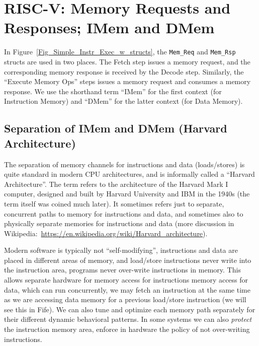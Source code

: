 
\section{RISC-V: Memory Requests and Responses; IMem and DMem}


In Figure~\ref{Fig_Simple_Instr_Exec_w_structs}, the \verb|Mem_Req|
and \verb|Mem_Rsp| structs are used in two places.  The Fetch step
issues a memory request, and the corresponding memory response is
received by the Decode step.  Similarly, the ``Execute Memory Ops''
steps issues a memory request and consumes a memory response.  We use
the shorthand term ``IMem'' for the first context (for Instruction
Memory) and ``DMem'' for the latter context (for Data Memory).


\subsection{Separation of IMem and DMem (Harvard Architecture)}

\label{Sec_Harvard_architecture}


The separation of memory channels for instructions and data
(loads/stores) is quite standard in modern CPU architectures, and is
informally called a ``Harvard Architecture''.  The term refers to the
architecture of the Harvard Mark I computer, designed and built by
Harvard University and IBM in the 1940s (the term itself was coined
much later).  It sometimes refers just to separate, concurrent paths
to memory for instructions and data, and sometimes also to physically
separate memories for instructions and data (more discussion in
Wikipedia:~\url{https://en.wikipedia.org/wiki/Harvard_architecture}).

Modern software is typically not ``self-modifying'', {\ie}
instructions and data are placed in different areas of memory, and
load/store instructions never write into the instruction area, {\ie}
programs never over-write instructions in memory.  This allows
separate hardware for memory access for instructions {\vs} memory
access for data, which can run concurrently, {\ie} we may fetch an
instruction at the same time as we are accessing data memory for a
previous load/store instruction (we will see this in Fife).  We can
also tune and optimize each memory path separately for their different
dynamic behavioral patterns.  In some systems we can also
\emph{protect} the instruction memory area, {\ie} enforce in hardware
the policy of not over-writing instructions.


